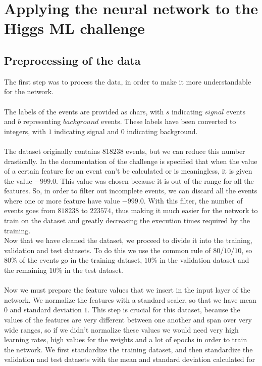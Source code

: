 \documentclass[12pt]{article}
\begin{document}
\section{Applying the neural network to the Higgs ML challenge}
\subsection{Preprocessing of the data}
The first step was to process the data, in order to make it more understandable for the network. \\ \\
The labels of the events are provided as chars, with $s$ indicating $signal$ events and $b$ representing 
$background$ events. These labels have been converted to integers, with $1$ indicating signal and $0$ 
indicating background. \\ \\
The dataset originally contains $818238$ events, but we can reduce this number drastically. In the 
documentation of the challenge is specified that when the value of a certain feature for an event can't be
calculated or is meaningless, it is given the value $-999.0$. This value was chosen because it is out of the 
range for all the features. So, in order to filter out incomplete events, we can discard all the events where
one or more feature have value $-999.0$. With this filter, the number of events goes from $818238$ to 
$223574$, thus making it much easier for the network to train on the dataset and greatly decreasing the 
execution times required by the training. \\
Now that we have cleaned the dataset, we proceed to divide it into the training, validation and test 
datasets. To do this we use the common rule of $80$/$10$/$10$, so $80\%$ of the events go in the training 
dataset, $10 \%$ in the validation dataset and the remaining $10 \%$ in the test dataset. \\ \\
Now we must prepare the feature values that we insert in the input layer of the network. We normalize the 
features with a standard scaler, so that we have mean $0$ and standard deviation $1$. This step is crucial
for this dataset, because the values of the features are very different between one another and span over 
very wide ranges, so if we didn't normalize these values we would need very high learning rates, high values 
for the weights and a lot of epochs in order to train the network. We first standardize the training dataset,
and then standardize the validation and test datasets with the mean and standard deviation calculated for
\end{document}
